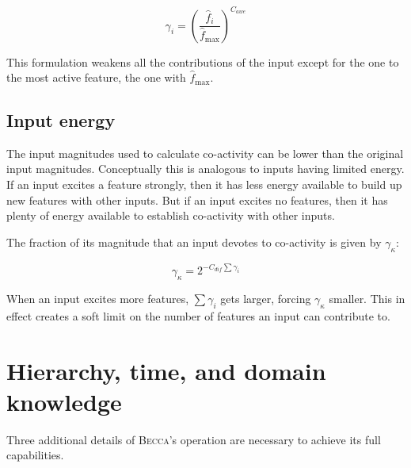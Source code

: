 \begin{equation}
\gamma_i = \left( \frac{\hat{f}_i}{\hat{f}_{\max}}\right ) ^ {C_{awe}}
\label{feedback_calculation}
\end{equation}

This formulation weakens all the contributions of the input except for the one to the most active feature, the one with $\hat{f}_{\max}$.

\subsection{Input energy}

The input magnitudes used to calculate co-activity can be lower than the original input magnitudes. Conceptually this is analogous to inputs having limited energy. If an input excites a feature strongly, then it has less energy available to build up new features with other inputs. But if an input excites no features, then it has plenty of energy available to establish co-activity with other inputs.

The fraction of its magnitude that an input devotes to co-activity is given by $\gamma_\kappa$:

\begin{equation}
\gamma_\kappa = 2 ^ { - C_{dif}\sum \gamma_i}
\end{equation}

When an input excites more features, $\sum \gamma_i$ gets larger, forcing $\gamma_\kappa$ smaller. This in effect creates a soft limit on the number of features an input can contribute to. 

\section{Hierarchy, time, and domain knowledge} 

Three additional details of \textsc{Becca}'s operation are necessary to achieve its full capabilities. 

